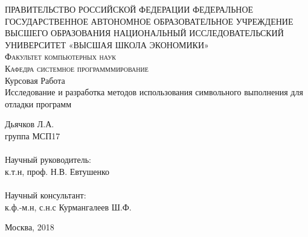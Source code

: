\begin{titlepage}
	\begin{center}
	\textsc{\large{ПРАВИТЕЛЬСТВО РОССИЙСКОЙ ФЕДЕРАЦИИ
ФЕДЕРАЛЬНОЕ ГОСУДАРСТВЕННОЕ АВТОНОМНОЕ
ОБРАЗОВАТЕЛЬНОЕ УЧРЕЖДЕНИЕ ВЫСШЕГО ОБРАЗОВАНИЯ
НАЦИОНАЛЬНЫЙ ИССЛЕДОВАТЕЛЬСКИЙ УНИВЕРСИТЕТ
«ВЫСШАЯ ШКОЛА ЭКОНОМИКИ»}
	\\[.5cm]
	\normalsize{Факультет компьютерных наук\\
	Кафедра системное программмирование}}
	\\[4cm]

	\large{Курсовая Работа }\\[1.5cm]

	{\Large {Исследование и разработка методов использования символьного выполнения для отладки программ}} \\[3cm]
	\begin{flushright}
		Дьячков Л.А.\\
		группа МСП17\\
		\\
		
		Научный руководитель: \\ 
		к.т.н, проф. Н.В. Евтушенко \\
		\\
		Научный консультант: \\ 
		к.ф.-м.н, с.н.с Курмангалеев Ш.Ф. \\
	\end{flushright}
	\vfill
	
	Москва, 2018
	\end{center}

\end{titlepage}


% 




